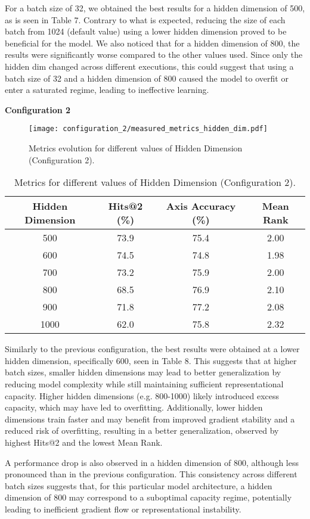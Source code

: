 For a batch size of 32, we obtained the best results for a hidden dimension of 500, as is seen in Table 7. Contrary to what is expected, reducing the size of each batch from 1024 (default value) using a lower hidden dimension proved to be beneficial for the model. We also noticed that for a hidden dimension of 800, the results were significantly worse compared to the other values used. Since only the hidden dim changed across different executions, this could suggest that using a batch size of 32 and a hidden dimension of 800 caused the model to overfit or enter a saturated regime, leading to ineffective learning.

\vspace{0.5cm}
\textbf{Configuration 2}
\begin{figure}[H]
    \centering
    \texttt{[image: configuration\_2/measured\_metrics\_hidden\_dim.pdf]}
    \caption{Metrics evolution for different values of Hidden Dimension (Configuration 2).}  
    \label{fig:metrics_hidden_dim_c2}               
\end{figure}


\begin{table}[h]
\centering
\caption{Metrics for different values of Hidden Dimension (Configuration 2).}
\begin{tabular}{|c|c|c|c|}
\hline
Hidden Dimension & Hits@2 (\%) & Axis Accuracy (\%) & Mean Rank \\
\hline
500  & 73.9 & 75.4 & 2.00\\
600  & 74.5 & 74.8 & 1.98\\
700  & 73.2 & 75.9 & 2.00\\
800  & 68.5 & 76.9 & 2.10\\
900  & 71.8 & 77.2 & 2.08\\
1000  & 62.0 & 75.8  & 2.32\\
\hline
\end{tabular}
\label{tab:metrics_hidden_dim_table_c2}
\end{table}

Similarly to the previous configuration, the best results were obtained at a lower hidden dimension, specifically 600, seen in Table 8. This suggests that at higher batch sizes, smaller hidden dimensions may lead to better generalization by reducing model complexity while still maintaining sufficient representational capacity. Higher hidden dimensions (e.g. 800-1000) likely introduced excess capacity, which may have led to overfitting. Additionally, lower hidden dimensions train faster and may benefit from improved gradient stability and a reduced risk of overfitting, resulting in a better generalization, observed by highest Hits@2 and the lowest Mean Rank. \par
A performance drop is also observed in a hidden dimension of 800, although less pronounced than in the previous configuration. This consistency across different batch sizes suggests that, for this particular model architecture, a hidden dimension of 800 may correspond to a suboptimal capacity regime, potentially leading to inefficient gradient flow or representational instability. 

